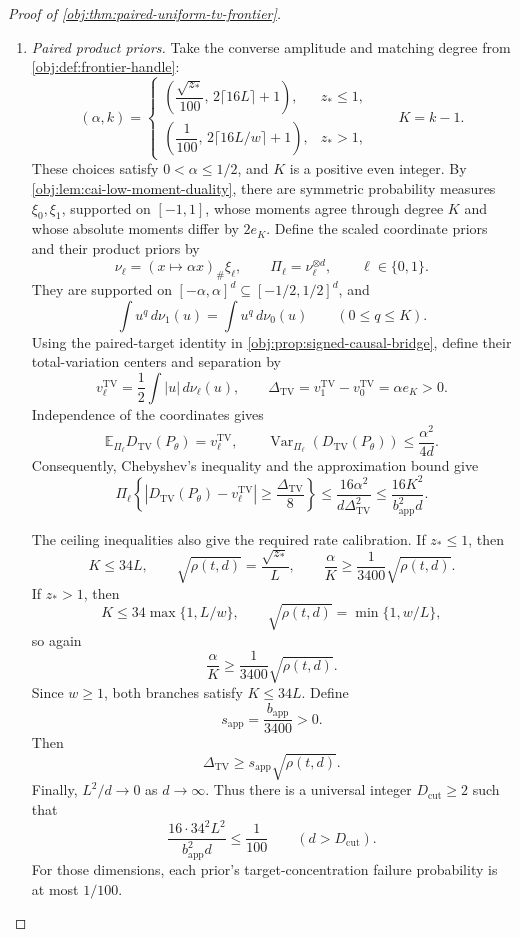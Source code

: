 \begin{proof}[Proof of \cref{obj:thm:paired-uniform-tv-frontier}]
\begin{enumerate}
\item \textit{Paired product priors.}
Take the converse amplitude and matching degree from \cref{obj:def:frontier-handle}:
\[
(\alpha,k)=
\begin{cases}
\left(\dfrac{\sqrt{z_*}}{100},\,2\lceil16L\rceil+1\right),&z_*\le1,\\[4pt]
\left(\dfrac1{100},\,2\lceil16L/w\rceil+1\right),&z_*>1,
\end{cases}
\qquad K=k-1.
\]
These choices satisfy \(0<\alpha\le1/2\), and \(K\) is a positive even integer.
By \cref{obj:lem:cai-low-moment-duality}, there are symmetric probability measures \(\xi_0,\xi_1\), supported on \([-1,1]\), whose moments agree through degree \(K\) and whose absolute moments differ by \(2e_K\). Define the scaled coordinate priors and their product priors by
\[
\nu_\ell=(x\mapsto\alpha x)_\#\xi_\ell,
\qquad
\Pi_\ell=\nu_\ell^{\otimes d},
\qquad \ell\in\{0,1\}.
\]
They are supported on \([-\alpha,\alpha]^d\subseteq[-1/2,1/2]^d\), and
\[
\int u^q\,d\nu_1(u)=\int u^q\,d\nu_0(u)
\qquad(0\le q\le K).
\]
Using the paired-target identity in \cref{obj:prop:signed-causal-bridge}, define their total-variation centers and separation by
\[
v_\ell^{\mathrm{TV}}=\frac12\int |u|\,d\nu_\ell(u),
\qquad
\Delta_{\mathrm{TV}}
=v_1^{\mathrm{TV}}-v_0^{\mathrm{TV}}
=\alpha e_K>0.
\]
Independence of the coordinates gives
\[
\mathbb E_{\Pi_\ell}D_{\mathrm{TV}}(P_\theta)=v_\ell^{\mathrm{TV}},
\qquad
\operatorname{Var}_{\Pi_\ell}\!\left(D_{\mathrm{TV}}(P_\theta)\right)
\le\frac{\alpha^2}{4d}.
\]
Consequently, Chebyshev's inequality and the approximation bound give
\[
\Pi_\ell\left\{
\left|D_{\mathrm{TV}}(P_\theta)-v_\ell^{\mathrm{TV}}\right|
\ge\frac{\Delta_{\mathrm{TV}}}{8}
\right\}
\le
\frac{16\alpha^2}{d\Delta_{\mathrm{TV}}^2}
\le\frac{16K^2}{b_{\mathrm{app}}^2d}.
\]

The ceiling inequalities also give the required rate calibration. If \(z_*\le1\), then
\[
K\le34L,\qquad
\sqrt{\rho(t,d)}=\frac{\sqrt{z_*}}{L},
\qquad
\frac{\alpha}{K}\ge\frac1{3400}\sqrt{\rho(t,d)}.
\]
If \(z_*>1\), then
\[
K\le34\max\{1,L/w\},
\qquad
\sqrt{\rho(t,d)}=\min\{1,w/L\},
\]
so again
\[
\frac{\alpha}{K}\ge\frac1{3400}\sqrt{\rho(t,d)}.
\]
Since \(w\ge1\), both branches satisfy \(K\le34L\). Define
\[
s_{\mathrm{app}}=\frac{b_{\mathrm{app}}}{3400}>0.
\]
Then
\[
\Delta_{\mathrm{TV}}\ge s_{\mathrm{app}}\sqrt{\rho(t,d)}.
\]
Finally, \(L^2/d\to0\) as \(d\to\infty\). Thus there is a universal integer \(D_{\mathrm{cut}}\ge2\) such that
\[
\frac{16\cdot34^2L^2}{b_{\mathrm{app}}^2d}\le\frac1{100}
\qquad(d>D_{\mathrm{cut}}).
\]
For those dimensions, each prior's target-concentration failure probability is at most \(1/100\).


\end{enumerate}
\end{proof}
